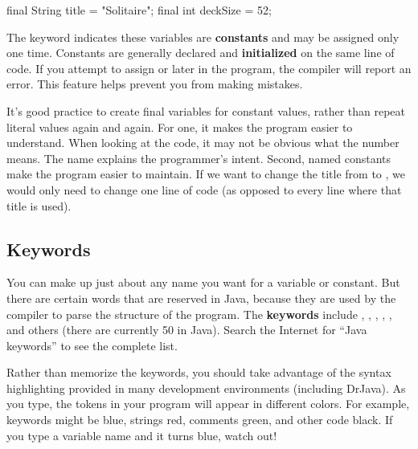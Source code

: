 \begin{code}
    final String title = "Solitaire";
    final int deckSize = 52;
\end{code}


The keyword  indicates these variables are {\bf constants} and may be assigned only one time.
Constants are generally declared and {\bf initialized} on the same line of code.
If you attempt to assign  or  later in the program, the compiler will report an error.
This feature helps prevent you from making mistakes.

It's good practice to create final variables for constant values, rather than repeat literal values again and again.
For one, it makes the program easier to understand.
When looking at the code, it may not be obvious what the number  means.
The name  explains the programmer's intent.
Second, named constants make the program easier to maintain.
If we want to change the title from  to , we would only need to change one line of code (as opposed to every line where that title is used).

\subsection{Keywords}


You can make up just about any name you want for a variable or constant.
But there are certain words that are reserved in Java, because they are used by the compiler to parse the structure of the program.
The {\bf keywords} include , , , , , and others (there are currently 50 in Java).
Search the Internet for ``Java keywords'' to see the complete list.


Rather than memorize the keywords, you should take advantage of the syntax highlighting provided in many development environments (including DrJava).
As you type, the tokens in your program will appear in different colors.
For example, keywords might be blue, strings red, comments green, and other code black.
If you type a variable name and it turns blue, watch out!


